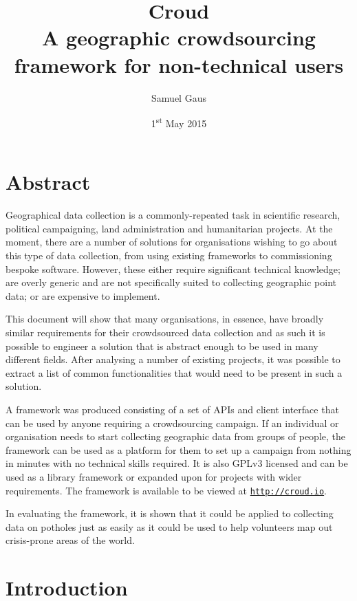 \documentclass{article}
\newcommand\ssection{\clearpage\section}
\begin{document}
	\title{Croud \\ \vspace{2 mm} {\large A geographic crowdsourcing framework for non-technical users}}
	\author{Samuel Gaus}
	\date{1\textsuperscript{st} May 2015}
	\maketitle

	\tableofcontents
	\listoffigures
	\listoftables
	\listoflistings

	\ssection*{Abstract}
	\label{sec:summary}
		Geographical data collection is a commonly-repeated task in scientific research, political campaigning, land administration and humanitarian projects. At the moment, there are a number of solutions for organisations wishing to go about this type of data collection, from using existing frameworks to commissioning bespoke software. However, these either require significant technical knowledge; are overly generic and are not specifically suited to collecting geographic point data; or are expensive to implement.

		This document will show that many organisations, in essence, have broadly similar requirements for their crowdsourced data collection and as such it is possible to engineer a solution that is abstract enough to be used in many different fields. After analysing a number of existing projects, it was possible to extract a list of common functionalities that would need to be present in such a solution.

		A framework was produced consisting of a set of APIs and client interface that can be used by anyone requiring a crowdsourcing campaign. If an individual or organisation needs to start collecting geographic data from groups of people, the framework can be used as a platform for them to set up a campaign from nothing in minutes with no technical skills required. It is also GPLv3 licensed and can be used as a library framework or expanded upon for projects with wider requirements. The framework is available to be viewed at \href{http://croud.io}{\nolinkurl{http://croud.io}}.

		In evaluating the framework, it is shown that it could be applied to collecting data on potholes just as easily as it could be used to help volunteers map out crisis-prone areas of the world.

	\ssection{Introduction}
	\label{sec:introduction}
\end{document}
